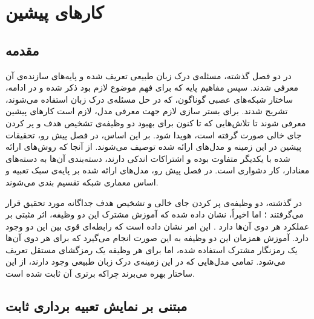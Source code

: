 \chapter{کارهای پیشین}
\pagebreak
\section{‌مقدمه}
در دو فصل گذشته، مسئله‌ی درک زبان طبیعی تعریف شده و پایه‌های سازنده‌ی آن معرفی شدند. سپس مفاهیم پایه که برای فهم موضوع لازم بود ذکر شده و در ادامه، ساختار شبکه‌های عصبی گوناگون، که در حل مسئله‌ی درک زبان استفاده می‌شوند، تشریح شدند. برای بستر سازی لازم جهت معرفی مدل، لازم است کارهای پیشین معرفی شوند تا تلاش‌هایی که تا کنون برای بهبود دو وظیفه‌ی تشخیص هدف و پر کردن جای خالی صورت گرفته است، هویدا شود. بر این اساس، در فصل پیش رو، تحقیقات پیشین در این زمینه و مدل‌های ارائه شده توصیف می‌شوند. از آنجا که روش‌های ارائه شده با یکدیگر متفاوت بوده و اشتراکات اندکی دارند، دسته‌بندی آن‌ها به دسته‌های معنادار، کار دشواری است. در فصل پیش رو،  مدل‌های ارائه شده بر پایه‌ی سبک تعبیه و اساس معماری شبکه تقسیم بندی می‌شوند.


در گذشته، دو وظیفه‌ی پر کردن جای خالی و تشخیص هدف جداگانه مورد تحقیق قرار می‌گرفتند \cite{louvan2018exploring,vu2016bi}؛ اما اخیراً، نشان داده شده که آموزش مشترک این دو وظیفه، اثر مثبتی بر عملکرد هر دوی آن‌ها دارد
\cite{aligned_lstm_atten_nlu,Wang:18,goo-etal-2018-slot,zhang-2018-joint,jaech2016domain,wei2022joint}.
این امر نشان داده است که رابطه‌ای قوی بین این دو وجود دارد. آموزش همزمان این دو وظیفه به این صورت انجام می‌گیرد که برای هر دوی آن‌ها یک رمزنگار مشترک استفاده شده، اما برای هر وظیفه یک رمزگشای مستقل تعریف می‌شود. تمامی مدل‌هایی که در این زمینه‌ی درک زبان طبیعی وجود دارند، از این ساختار بهره می‌برند چراکه برتری آن ثابت شده است.
\section{مبتنی بر نمایش تعبیه برداری ثابت}

